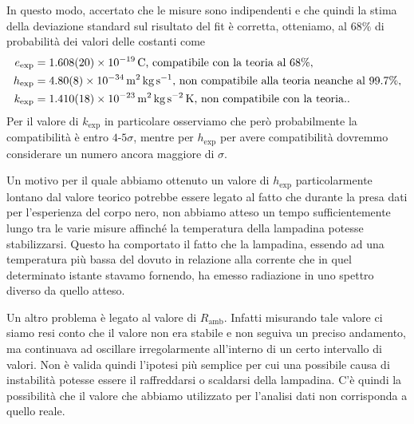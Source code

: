 \documentclass[a4paper, varvw, nofootinbib]{revtex4-2}
\begin{document}
In questo modo, accertato che le misure sono indipendenti e che quindi la stima della deviazione standard sul risultato del fit è corretta, otteniamo, al $68\%$ di probabilità dei valori delle costanti come \[
    \begin{aligned}
        e_\text{exp} &= \SI{1.608 +- 0.020 e-19}{\coulomb}\text{, compatibile con la teoria al $68\%$},\\
        h_\text{exp} &= \SI{4.80 +- 0.08 e-34}{\metre\squared\kilo\gram\per\second}\text{, non compatibile alla teoria neanche al 99.7\%},\\
        k_\text{exp} &= \SI{1.410 +- 0.018 e-23}{\metre\squared\kilo\gram\per\second\squared\kelvin}\text{, non compatibile con la teoria.}.
    \end{aligned}
\] Per il valore di $k_\text{exp}$ in particolare osserviamo che però probabilmente la compatibilità è entro $4$-$5\sigma$, mentre per $h_\text{exp}$ per avere compatibilità dovremmo considerare un numero ancora maggiore di $\sigma$. 

Un motivo per il quale abbiamo ottenuto un valore di $h_\text{exp}$ particolarmente lontano dal valore teorico potrebbe essere legato al fatto che durante la presa dati per l'esperienza del corpo nero, non abbiamo atteso un tempo sufficientemente lungo tra le varie misure affinché la temperatura della lampadina potesse stabilizzarsi. Questo ha comportato il fatto che la lampadina, essendo ad una temperatura più bassa del dovuto in relazione alla corrente che in quel determinato istante stavamo fornendo, ha emesso radiazione in uno spettro diverso da quello atteso.

Un altro problema è legato al valore di $R_\text{amb}$. Infatti misurando tale valore ci siamo resi conto che il valore non era stabile e non seguiva un preciso andamento, ma continuava ad oscillare irregolarmente all'interno di un certo intervallo di valori. Non è valida quindi l'ipotesi più semplice per cui una possibile causa di instabilità potesse essere il raffreddarsi o scaldarsi della lampadina. C'è quindi la possibilità che il valore che abbiamo utilizzato per l'analisi dati non corrisponda a quello reale. 
\end{document}
